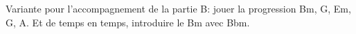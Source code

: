 
\tune

Variante pour l'accompagnement de la partie B: jouer la progression Bm, G, Em,
G, A. Et de temps en temps, introduire le Bm avec Bbm.
